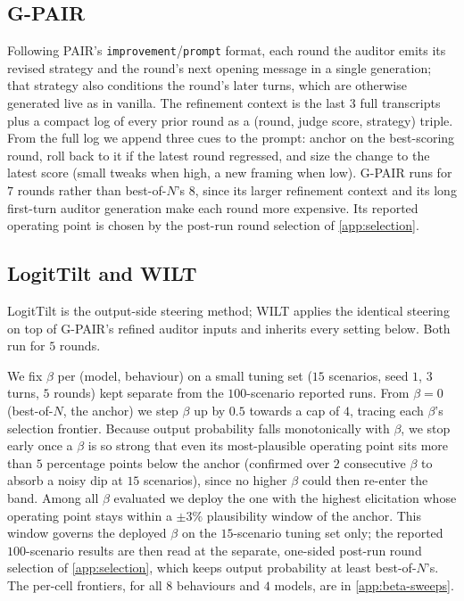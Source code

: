 \documentclass{article}
\theoremstyle{plain}
\theoremstyle{definition}
\theoremstyle{remark}
\begin{document}
\subsection{G-PAIR}
Following PAIR's \texttt{improvement}/\texttt{prompt} format, each round the auditor emits its revised strategy and the round's next opening message in a single generation; that strategy also conditions the round's later turns, which are otherwise generated live as in vanilla. The refinement context is the last $3$ full transcripts plus a compact log of every prior round as a (round, judge score, strategy) triple. From the full log we append three cues to the prompt: anchor on the best-scoring round, roll back to it if the latest round regressed, and size the change to the latest score (small tweaks when high, a new framing when low). G-PAIR runs for $7$ rounds rather than best-of-$N$'s $8$, since its larger refinement context and its long first-turn auditor generation make each round more expensive. Its reported operating point is chosen by the post-run round selection of \cref{app:selection}.

\subsection{LogitTilt and WILT}\label{app:logittilt}
LogitTilt is the output-side steering method; WILT applies the identical steering on top of G-PAIR's refined auditor inputs and inherits every setting below. Both run for $5$ rounds.

We fix $\beta$ per (model, behaviour) on a small tuning set ($15$ scenarios, seed $1$, $3$ turns, $5$ rounds) kept separate from the $100$-scenario reported runs. From $\beta = 0$ (best-of-$N$, the anchor) we step $\beta$ up by $0.5$ towards a cap of $4$, tracing each $\beta$'s selection frontier. Because output probability falls monotonically with $\beta$, we stop early once a $\beta$ is so strong that even its most-plausible operating point sits more than $5$ percentage points below the anchor (confirmed over $2$ consecutive $\beta$ to absorb a noisy dip at $15$ scenarios), since no higher $\beta$ could then re-enter the band. Among all $\beta$ evaluated we deploy the one with the highest elicitation whose operating point stays within a $\pm 3\%$ plausibility window of the anchor. This window governs the deployed $\beta$ on the $15$-scenario tuning set only; the reported $100$-scenario results are then read at the separate, one-sided post-run round selection of \cref{app:selection}, which keeps output probability at least best-of-$N$'s. The per-cell frontiers, for all $8$ behaviours and $4$ models, are in \cref{app:beta-sweeps}.
\end{document}
